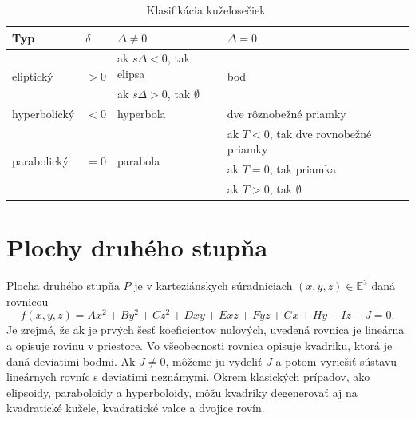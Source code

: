 
\begin{table}[h]
\centering
\begin{tabular}{|l|l|l|l|}
\hline
\textbf{Typ} & $\delta$ & $\Delta \neq  0$ & $\Delta = 0 $ \\
\hline
\multirow{2}{*}{eliptický} & \multirow{2}{*}{$> 0$} & ak $s\Delta < 0$, tak elipsa & \multirow{2}{*}{bod} \\
& & ak $s\Delta > 0$, tak $\emptyset$ & \\
\hline
hyperbolický & $< 0$ & hyperbola & dve rôznobežné priamky \\
\hline
\multirow{3}{*}{parabolický} & \multirow{3}{*}{$= 0$} & \multirow{3}{*}{parabola} & ak $T < 0$, tak dve rovnobežné priamky \\
& & & ak $T = 0$, tak priamka \\
& & & ak $T > 0$, tak $\emptyset$ \\
\hline
\end{tabular}
\caption{Klasifikácia kužeľosečiek.}
\label{tab:conic_sections}
\end{table}

\section{Plochy druhého stupňa}
Plocha druhého stupňa $P$ je v karteziánskych súradniciach $(x, y, z) \in \mathbb{E}^3$ daná rovnicou
\[ f(x, y, z) = Ax^2 + By^2 + Cz^2 + Dxy + Exz + Fyz + Gx + Hy + Iz + J = 0. \]
Je zrejmé, že ak je prvých šesť koeficientov nulových, uvedená rovnica je lineárna a opisuje rovinu v priestore. Vo všeobecnosti rovnica opisuje kvadriku, ktorá je daná deviatimi bodmi. Ak $J \neq 0$, môžeme ju vydeliť $J$ a potom vyriešiť sústavu lineárnych rovníc s deviatimi neznámymi. Okrem klasických prípadov, ako elipsoidy, paraboloidy a hyperboloidy, môžu kvadriky degenerovať aj na kvadratické kužele, kvadratické valce a dvojice rovín.

